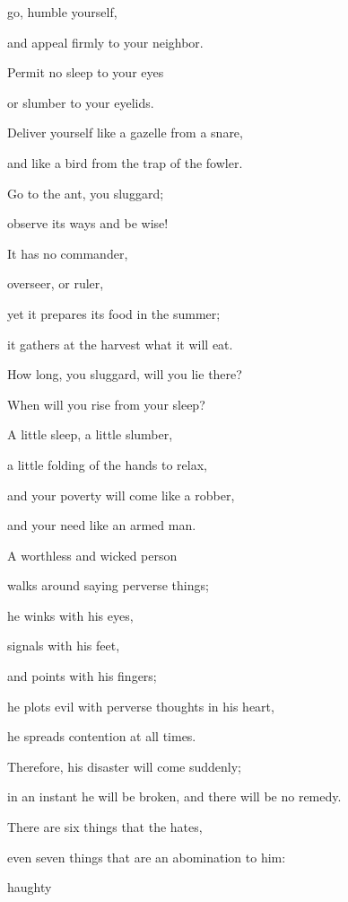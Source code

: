 {\par }{\Q go,
humble yourself,
\par }{\Q and appeal firmly
to your neighbor.
\par }{\Q {}Permit
no
sleep
to your eyes
\par }{\Q or slumber
to your eyelids.
\par }{\Q {}Deliver
yourself like a gazelle
from a snare,
\par }{\Q and like a bird
from the trap
of the fowler.
\par }{\Q {}Go
to
the ant,
you sluggard;
\par }{\Q observe
its ways
and be wise!
\par }{\Q {}It has
no
commander,
\par }{\Q overseer,
or ruler,
\par }{\Q {}yet it prepares
its food
in the summer;
\par }{\Q it gathers
at the harvest
what it will eat.
\par }{\Q {}How long,
you sluggard,
will you lie
there?
\par }{\Q When
will you rise
from your sleep?
\par }{\Q {}A little
sleep,
a little
slumber,
\par }{\Q a little
folding
of the hands
to relax,
\par }{\Q {}and your poverty
will come
like a robber,
\par }{\Q and your need
like an armed
man.
\par }{\Q {}A
worthless
and wicked
person
\par }{\Q walks
around saying
perverse things;
\par }{\Q {}he winks
with his eyes,
\par }{\Q signals
with his feet,
\par }{\Q and points
with his fingers;
\par }{\Q {}he plots
evil
with perverse
thoughts in his heart,
\par }{\Q he spreads
contention
at all
times.
\par }{\Q {}Therefore,
his disaster
will come
suddenly;
\par }{\Q in an instant
he will be broken,
and there will be no
remedy.
\par }{\Q {}There are six
things
that the
{}
hates,
\par }{\Q even seven
things that are an abomination to him:
\par }{\Q {}haughty
}
